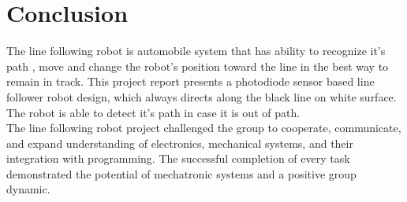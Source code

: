 \documentclass[12pt]{article}
\begin{document}
\section{Conclusion}
The line following robot is automobile system that has ability to recognize it's path , move and change the robot's position toward the line in the best way to remain in track. This project report presents a photodiode sensor based line follower robot design, which always directs along the black line on white surface. The robot is able to detect it’s path in case it is out of path.\\ 
The line following robot project  challenged the  group to cooperate, communicate,  and expand  understanding  of  electronics,  mechanical  systems,  and  their  integration  with programming.  The successful  completion  of every task  demonstrated  the potential  of mechatronic systems and a positive group dynamic. 
\end{document}
